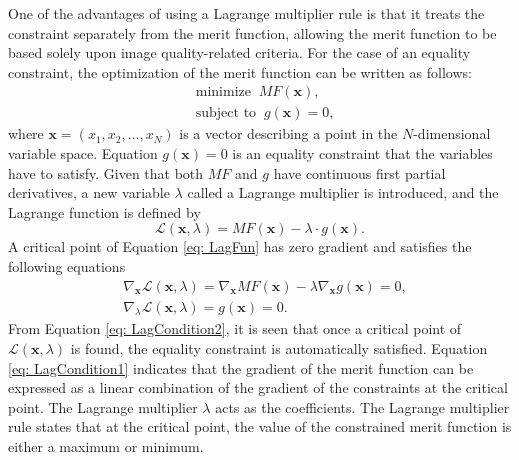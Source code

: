 One of the advantages of using a Lagrange multiplier rule is that it treats  the constraint separately from the merit function, allowing the merit function to be based solely upon image quality-related criteria. For the case of an equality constraint, the optimization of the merit function can be written as follows:
\setlength{\belowdisplayshortskip}{5pt}
\setlength{\abovedisplayshortskip}{5pt}
\begin{equation} \label{eq: MFminCon}
\begin{split}
& \text{minimize}\;\; MF(\textbf{x}), \\
& \text{subject to}\;\; g(\textbf{x}) = 0,
\end{split}
\end{equation}
\noindent where $\textbf{x} = (x_1, x_2, ..., x_N)$ is a vector describing a point in the $N$-dimensional variable space. Equation $g(\textbf{x})=0$ is an equality constraint that the variables have to satisfy. Given that both $MF$ and $g$ have continuous first partial derivatives, a new variable $\lambda$ called a Lagrange multiplier is introduced, and the Lagrange function is defined by
\setlength{\belowdisplayshortskip}{5pt}
\setlength{\abovedisplayshortskip}{5pt}
\begin{equation} \label{eq: LagFun}
\mathcal{L}(\textbf{x},\lambda)=MF(\textbf{x})-\lambda\cdot g(\textbf{x}).
\end{equation}A critical point of Equation \ref{eq: LagFun} has zero gradient and satisfies the following equations
\setlength{\belowdisplayshortskip}{5pt}
\setlength{\abovedisplayshortskip}{5pt}
\begin{subequations} 
\begin{align}
& \nabla_\textbf{x}\mathcal{L}(\textbf{x},\lambda)=\nabla_\textbf{x}MF(\textbf{x})-\lambda\nabla_\textbf{x}g(\textbf{x})=0, \label{eq: LagCondition1} \\
& \nabla_\lambda\mathcal{L}(\textbf{x},\lambda)=g(\textbf{x})=0. \label{eq: LagCondition2}
\end{align}
\end{subequations}
From Equation \ref{eq: LagCondition2}, it is seen that once a critical point of $\mathcal{L}(\textbf{x},\lambda)$ is found, the equality constraint is automatically satisfied. Equation \ref{eq: LagCondition1} indicates that the gradient of the merit function can be expressed as a linear combination of the gradient of the constraints at the critical point. The Lagrange multiplier $\lambda$ acts as the coefficients. The Lagrange multiplier rule states that at the critical point, the value of the constrained merit function is either a maximum or minimum. 
